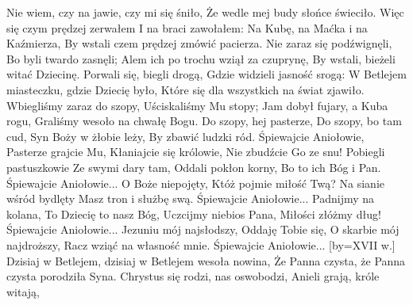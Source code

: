       Nie wiem, czy na jawie, czy mi się śniło,
      Że wedle mej budy słońce świeciło. 
  \endchorus
\beginverse
    Więc się czym prędzej zerwałem
    I na braci zawołałem:
\endverse
  \beginchorus
      Na Kubę, na Maćka i na Kaźmierza,
      By wstali czem prędzej zmówić pacierza.
  \endchorus
\beginverse
    Nie zaraz się podźwignęli,
    Bo byli twardo zasnęli;
\endverse
  \beginchorus
      Alem ich po trochu wziął za czuprynę,
      By wstali, bieżeli witać Dziecinę.
  \endchorus
\beginverse
    Porwali się, biegli drogą,
    Gdzie widzieli jasność srogą:
\endverse
  \beginchorus
      W Betlejem miasteczku, gdzie Dziecię było,
      Które się dla wszystkich na świat zjawiło.
  \endchorus
\beginverse
    Wbiegliśmy zaraz do szopy,
    Uściskaliśmy Mu stopy;
\endverse
  \beginchorus
      Jam dobył fujary, a Kuba rogu,
      Graliśmy wesoło na chwałę Bogu.
  \endchorus
\endsong
\beginverse
    Do szopy, hej pasterze,
    Do szopy, bo tam cud,
    Syn Boży w żłobie leży,
    By zbawić ludzki ród.
\endverse
\beginchorus
        Śpiewajcie Aniołowie,
        Pasterze grajcie Mu,
        Kłaniajcie się królowie,
        Nie zbudźcie Go ze snu!
\endchorus
\beginverse
    Pobiegli pastuszkowie
    Ze swymi dary tam,
    Oddali pokłon korny,
    Bo to ich Bóg i Pan.
\endverse
\beginchorus
        Śpiewajcie Aniołowie...
\endchorus
\beginverse
    O Boże niepojęty,
    Któż pojmie miłość Twą?
    Na sianie wśród bydlęty
    Masz tron i służbę swą.
\endverse
\beginchorus
        Śpiewajcie Aniołowie...
\endchorus
\beginverse
    Padnijmy na kolana,
    To Dziecię to nasz Bóg,
    Uczcijmy niebios Pana,
    Miłości złóżmy dług!
\endverse
\beginchorus
        Śpiewajcie Aniołowie...
\endchorus
\beginverse
    Jezuniu mój najsłodszy,
    Oddaję Tobie się,
    O skarbie mój najdroższy,
    Racz wziąć na własność mnie.
\endverse
\beginchorus
        Śpiewajcie Aniołowie...
\endchorus
\endsong
[by={XVII w.}]
\beginverse
    Dzisiaj w Betlejem, dzisiaj w Betlejem wesoła nowina,
    Że Panna czysta, że Panna czysta porodziła Syna.
\endverse
\beginchorus
    Chrystus się rodzi, nas oswobodzi,
    Anieli grają, króle witają,
